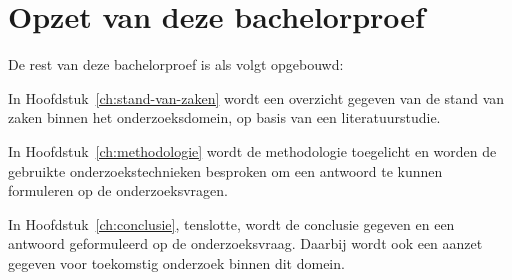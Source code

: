 \section{Opzet van deze bachelorproef}
\label{sec:opzet-bachelorproef}


De rest van deze bachelorproef is als volgt opgebouwd:

In Hoofdstuk~\ref{ch:stand-van-zaken} wordt een overzicht gegeven van de stand van zaken binnen het onderzoeksdomein, op basis van een literatuurstudie.

In Hoofdstuk~\ref{ch:methodologie} wordt de methodologie toegelicht en worden de gebruikte onderzoekstechnieken besproken om een antwoord te kunnen formuleren op de onderzoeksvragen.


In Hoofdstuk~\ref{ch:conclusie}, tenslotte, wordt de conclusie gegeven en een antwoord geformuleerd op de onderzoeksvraag. Daarbij wordt ook een aanzet gegeven voor toekomstig onderzoek binnen dit domein.

